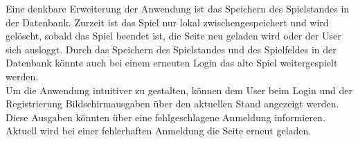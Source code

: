 Eine denkbare Erweiterung der Anwendung ist das Speichern des Spielstandes in der Datenbank. Zurzeit ist das Spiel nur lokal zwischengespeichert und wird gelöscht, sobald das Spiel beendet ist, die Seite neu geladen wird oder der User sich ausloggt. Durch das Speichern des Spielstandes und des Spielfeldes in der Datenbank könnte auch bei einem erneuten Login das alte Spiel weitergespielt werden.\\
Um die Anwendung intuitiver zu gestalten, können dem User beim Login und der Registrierung Bildschirmausgaben über den aktuellen Stand angezeigt werden. Diese Ausgaben könnten über eine fehlgeschlagene Anmeldung informieren. Aktuell wird bei einer fehlerhaften Anmeldung die Seite erneut geladen. 